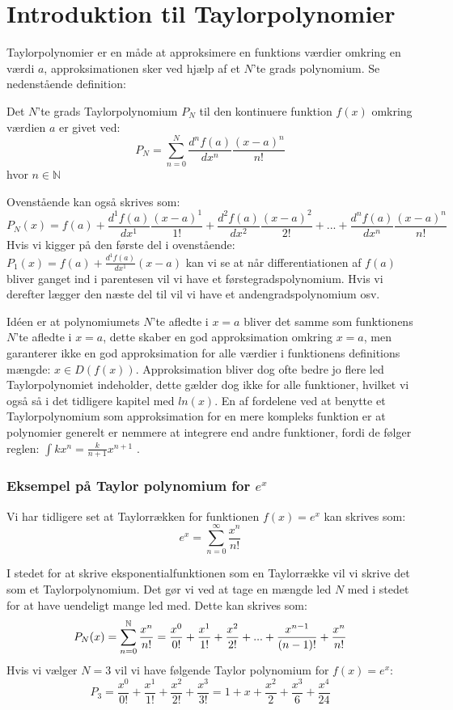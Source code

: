 \chapter{Introduktion til Taylorpolynomier}
\label{ch:tp}
Taylorpolynomier er en måde at approksimere en funktions værdier omkring en værdi $a$, 
approksimationen sker ved hjælp af et $N$'te grads polynomium. Se nedenstående definition: 
\begin{defn}
    Det $N$'te grads Taylorpolynomium $P_N$ til den kontinuere funktion $f(x)$ omkring værdien $a$ er givet ved:
    \[
    P_N = \sum^{N}_{n=0} \frac{d^n f(a)}{dx^n}\frac{(x-a)^{n}}{n!}
    \]
    hvor $n \in \mathbb{N}$
\end{defn}
\label{def:taylorPolynomium}
Ovenstående kan også skrives som:
    \[
    P_N(x)=f(a)+\frac{d^1 f(a)}{dx^1} \frac{(x-a)^{1}}{1!}+\frac{d^2 f(a)}{dx^2} \frac{(x-a)^{2}}{2!}+...+\frac{d^n f(a)}{dx^n} \frac{(x-a)^{n}}{n!}
    \]
Hvis vi kigger på den første del i ovenstående: $P_1(x)=f(a)+\frac{d^1 f(a)}{dx^1}(x-a)$ kan vi se at når differentiationen af $f(a)$ bliver ganget ind i parentesen vil vi have et førstegradspolynomium. 
Hvis vi derefter lægger den næste del til vil vi have et andengradspolynomium osv. 

Idéen er at polynomiumets $N$'te afledte i $x = a$ bliver det samme som funktionens $N$'te afledte i $x = a$, 
dette skaber en god approksimation omkring $x = a$, men garanterer ikke en god approksimation 
for alle værdier i funktionens definitions mængde: $x \in D(f(x))$. Approksimation bliver dog ofte bedre jo 
flere led Taylorpolynomiet indeholder, dette gælder dog ikke for alle funktioner, hvilket vi også så i det tidligere kapitel med $ln(x)$.
En af fordelene ved at benytte et Taylorpolynomium som approksimation for en mere kompleks funktion
er at polynomier generelt er nemmere at integrere end andre funktioner, fordi de følger reglen: $\int k x^n = \frac{k}{n + 1}x^{n + 1}$ .


\subsection*{Eksempel på Taylor polynomium for $e^x$}
Vi har tidligere set at Taylorrækken for funktionen $f(x)=e^x$ kan skrives som:
\[
e^x=\sum^{\infty}_{n=0}\frac{x^n}{n!}
\]

I stedet for at skrive eksponentialfunktionen som en Taylorrække vil vi skrive det som et Taylorpolynomium. Det gør vi ved at tage en mængde led $N$ med  i stedet for at have uendeligt mange led med. Dette kan skrives som:
\[
P_N(x)=\sum^{\mathbb{N}}_{n=0}\frac{x^n}{n!}=\frac{x^0}{0!}+\frac{x^1}{1!}+\frac{x^2}{2!}+...+\frac{x^{n-1}}{(n-1)!}+\frac{x^n}{n!}
\]
Hvis vi vælger $N=3$ vil vi have følgende Taylor polynomium for $f(x)=e^x$:
\[
P_3=\frac{x^0}{0!}+\frac{x^1}{1!}+\frac{x^2}{2!}+\frac{x^3}{3!}=1+x+\frac{x^2}{2}+\frac{x^3}{6}+\frac{x^4}{24}
\]

